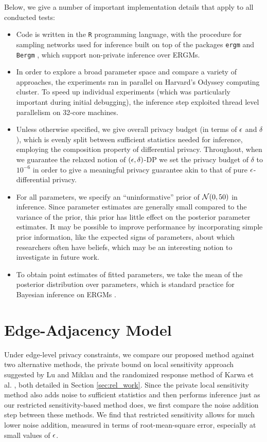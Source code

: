 Below, we give a number of important implementation details that apply to all conducted tests:
\begin{itemize}
	\item Code is written in the \texttt{R} programming language, with the procedure for sampling networks used for inference built on top of the packages \texttt{ergm} \cite{ergm} and \texttt{Bergm} \cite{Bergm}, which support non-private inference over ERGMs.
	\item In order to explore a broad parameter space and compare a variety of approaches, the experiments ran in parallel on Harvard's Odyssey computing cluster. To speed up individual experiments (which was particularly important during initial debugging), the  inference step exploited thread level parallelism  on 32-core machines.
	\item Unless otherwise specified, we give overall privacy budget (in terms of $\epsilon$ and $\delta$), which is evenly split between sufficient statistics needed for inference, employing the composition property of differential privacy. Throughout, when we guarantee the relaxed notion of $(\epsilon, \delta)$-DP we set the privacy budget of $\delta$ to $10^{-6}$ in order to give a meaningful privacy guarantee akin to that of pure $\epsilon$-differential privacy.
	\item For all parameters, we specify an ``uninformative'' prior of $\mathcal{N}(0, 50)$ in inference. Since parameter estimates are generally small compared to the variance of the prior, this prior has little effect on the posterior parameter estimates.  It may be possible to improve performance by incorporating simple prior information, like the expected signs of parameters, about which researchers often have beliefs, which may be an interesting notion to investigate in future work.
	\item To obtain point estimates of fitted parameters, we take the mean of the posterior distribution over parameters, which is standard practice for Bayesian inference on ERGMs \cite{CF11}.
\end{itemize}
 
 \section{Edge-Adjacency Model}
 
Under edge-level privacy constraints, we compare our proposed method against two alternative methods, the private bound on local sensitivity approach suggested by Lu and Miklau \cite{LM14} and the randomized response method of Karwa et al. \cite{KKS17}, both detailed in Section \ref{sec:rel_work}. Since the private local sensitivity method also adds noise to sufficient statistics and then performs inference just as our restricted sensitivity-based method does, we first compare the noise addition step between these methods. We find that restricted sensitivity allows for much lower noise addition, measured in terms of root-mean-square error, especially at small values of $\epsilon$. 

